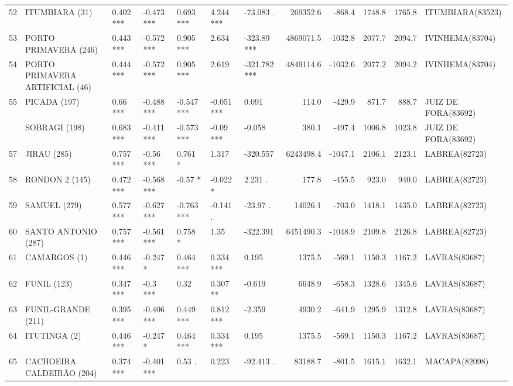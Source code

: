 \documentclass[12pt,oneside]{book}\usepackage[]{graphicx}\usepackage[]{color}
\newenvironment{knitrout}{}{} %
\theoremstyle{definition} %
\begin{document}
\begin{knitrout}
\begin{landscape}
\begin{table}
{\begin{tabular}[t]{lllllllrrrrl}
52 & ITUMBIARA (31) & 0.402 *** & -0.473 *** & 0.693 *** & 4.244 *** & -73.083 . & 269352.6 & -868.4 & 1748.8 & 1765.8 & ITUMBIARA(83523)\\
\rowcolor{gray!6}  53 & PORTO PRIMAVERA (246) & 0.443 *** & -0.572 *** & 0.905 *** & 2.634 & -323.89 *** & 4869071.5 & -1032.8 & 2077.7 & 2094.7 & IVINHEMA(83704)\\
54 & PORTO PRIMAVERA ARTIFICIAL (46) & 0.444 *** & -0.572 *** & 0.905 *** & 2.619 & -321.782 *** & 4849114.6 & -1032.6 & 2077.2 & 2094.2 & IVINHEMA(83704)\\
\rowcolor{gray!6}  55 & PICADA (197) & 0.66 *** & -0.488 *** & -0.547 *** & -0.051 *** & 0.091 & 114.0 & -429.9 & 871.7 & 888.7 & JUIZ DE FORA(83692)\\
\addlinespace
56 & SOBRAGI (198) & 0.683 *** & -0.411 *** & -0.573 *** & -0.09 *** & -0.058 & 380.1 & -497.4 & 1006.8 & 1023.8 & JUIZ DE FORA(83692)\\
\rowcolor{gray!6}  57 & JIRAU (285) & 0.757 *** & -0.56 *** & 0.761 * & 1.317 & -320.557 & 6243498.4 & -1047.1 & 2106.1 & 2123.1 & LABREA(82723)\\
58 & RONDON 2 (145) & 0.472 *** & -0.568 *** & -0.57 * & -0.022 * & 2.231 . & 177.8 & -455.5 & 923.0 & 940.0 & LABREA(82723)\\
\rowcolor{gray!6}  59 & SAMUEL (279) & 0.577 *** & -0.627 *** & -0.763 *** & -0.141 . & -23.97 . & 14026.1 & -703.0 & 1418.1 & 1435.0 & LABREA(82723)\\
60 & SANTO ANTONIO (287) & 0.757 *** & -0.561 *** & 0.758 * & 1.35 & -322.391 & 6451490.3 & -1048.9 & 2109.8 & 2126.8 & LABREA(82723)\\
\addlinespace
\rowcolor{gray!6}  61 & CAMARGOS (1) & 0.446 *** & -0.247 * & 0.464 *** & 0.334 *** & 0.195 & 1375.5 & -569.1 & 1150.3 & 1167.2 & LAVRAS(83687)\\
62 & FUNIL (123) & 0.347 *** & -0.3 *** & 0.32 & 0.307 ** & -0.619 & 6648.9 & -658.3 & 1328.6 & 1345.6 & LAVRAS(83687)\\
\rowcolor{gray!6}  63 & FUNIL-GRANDE (211) & 0.395 *** & -0.406 *** & 0.449 *** & 0.812 *** & -2.359 & 4930.2 & -641.9 & 1295.9 & 1312.8 & LAVRAS(83687)\\
64 & ITUTINGA (2) & 0.446 *** & -0.247 * & 0.464 *** & 0.334 *** & 0.195 & 1375.5 & -569.1 & 1150.3 & 1167.2 & LAVRAS(83687)\\
\rowcolor{gray!6}  65 & CACHOEIRA CALDEIRÃO (204) & 0.374 *** & -0.401 *** & 0.53 . & 0.223 & -92.413 . & 83188.7 & -801.5 & 1615.1 & 1632.1 & MACAPA(82098)\\

\end{tabular}}
\end{table}
\end{landscape}
\end{knitrout}
\end{document}
